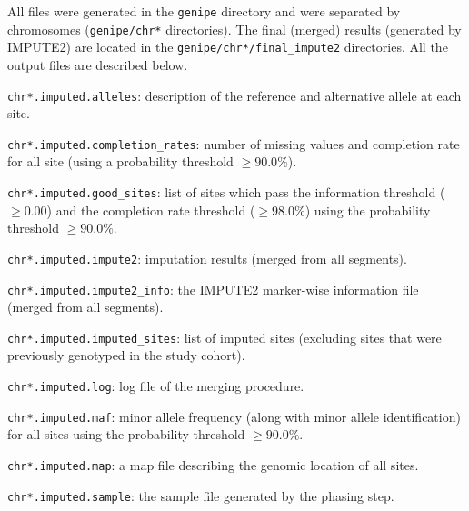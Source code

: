 \documentclass[10pt,twoside,english]{scrartcl}
\let\tempone\itemize
\let\temptwo\enditemize
\renewenvironment{itemize}{\tempone\setlength{\itemsep}{0pt}}{\temptwo}
\begin{document}
All files were generated in the \texttt{genipe} directory and were
separated by chromosomes (\texttt{genipe/chr*} directories). The
final (merged) results (generated by IMPUTE2) are located in the
\texttt{genipe/chr*/final\_impute2} directories. All the output files are
described below.


\begin{itemize}

\item \texttt{chr*.imputed.alleles}: description of the reference and
alternative allele at each site.


\item \texttt{chr*.imputed.completion\_rates}: number of missing values and
completion rate for all site (using a probability threshold $\geq
90.0\%$).


\item \texttt{chr*.imputed.good\_sites}: list of sites which pass the
information threshold ($\geq 0.00$) and the completion rate threshold
($\geq 98.0\%$) using the probability threshold $\geq 90.0\%$.


\item \texttt{chr*.imputed.impute2}: imputation results (merged from all
segments).


\item \texttt{chr*.imputed.impute2\_info}: the IMPUTE2 marker-wise
information file (merged from all segments).


\item \texttt{chr*.imputed.imputed\_sites}: list of imputed sites (excluding
sites that were previously genotyped in the study cohort).


\item \texttt{chr*.imputed.log}: log file of the merging procedure.


\item \texttt{chr*.imputed.maf}: minor allele frequency (along with minor
allele identification) for all sites using the probability threshold
$\geq 90.0\%$.


\item \texttt{chr*.imputed.map}: a map file describing the genomic location
of all sites.


\item \texttt{chr*.imputed.sample}: the sample file generated by the phasing
step.

\end{itemize}
\end{document}

